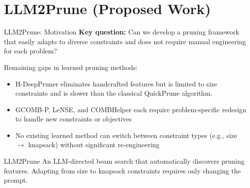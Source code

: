 \documentclass[aspectratio=169,xcolor=dvipsnames,8pt]{beamer}
\begin{document}
\section{LLM2Prune (Proposed Work)}

\begin{frame}{LLM2Prune: Motivation}
  \textbf{Key question:} Can we develop a pruning framework that easily adapts
  to diverse constraints and does not require manual engineering for each problem?

  \vspace{0.3cm}

  Remaining gaps in learned pruning methods:
  \begin{itemize}
    \item H-DeepPruner eliminates handcrafted features but is limited to size constraints and is slower than the classical QuickPrune algorithm.
    \item GCOMB-P, LeNSE, and COMBHelper each require
      problem-specific redesign to handle new constraints or objectives
    \item No existing learned method can switch between constraint types
      (e.g., size $\to$ knapsack) without significant re-engineering
  \end{itemize}

  \vspace{0.3cm}

  \begin{block}{LLM2Prune}
    An LLM-directed beam search that automatically discovers pruning
    features. Adapting from size to knapsack constraints requires only changing
    the prompt.
  \end{block}
\end{frame}
\end{document}
